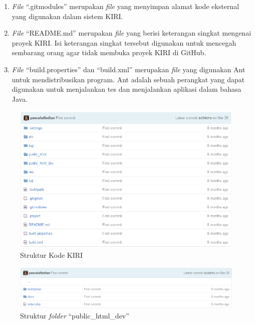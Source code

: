 \begin{enumerate}
	\item \textit{File} ``.gitmodules'' merupakan \textit{file} yang menyimpan alamat kode eksternal yang digunakan dalam sistem KIRI.
	\item \textit{File} ``README.md'' merupakan \textit{file} yang berisi keterangan singkat mengenai proyek KIRI. Isi keterangan singkat tersebut digunakan untuk mencegah sembarang orang agar tidak membuka proyek KIRI di GitHub.
	\item \textit{File} ``build.properties'' dan ``build.xml'' merupakan \textit{file} yang digunakan Ant untuk mendistribusikan program. Ant adalah sebuah perangkat yang dapat digunakan untuk menjalankan tes dan menjalankan aplikasi dalam bahasa Java\cite{ant}.
\end{enumerate}

\begin{figure}[htbp]
	\centering
		\includegraphics[scale=0.5]{Gambar/3_strukturkiri.png}
	\caption{Struktur Kode KIRI}
	\label{fig:3_strukturkiri}
\end{figure}

\begin{figure}[htbp]
	\centering
		\includegraphics[scale=0.5]{Gambar/3_public_html_dev.png}
	\caption{Struktur \textit{folder} ``public\_html\_dev''}
	\label{fig:3_public_html_dev}
\end{figure}

